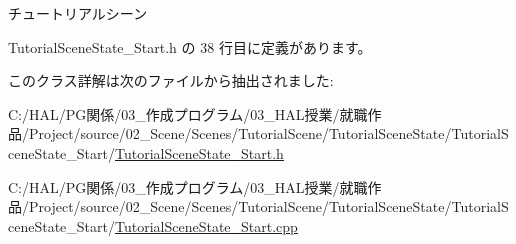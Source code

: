 チュートリアルシーン 



 Tutorial\+Scene\+State\+\_\+\+Start.\+h の 38 行目に定義があります。



このクラス詳解は次のファイルから抽出されました\+:\begin{DoxyCompactItemize}
\item 
C\+:/\+H\+A\+L/\+P\+G関係/03\+\_\+作成プログラム/03\+\_\+\+H\+A\+L授業/就職作品/\+Project/source/02\+\_\+\+Scene/\+Scenes/\+Tutorial\+Scene/\+Tutorial\+Scene\+State/\+Tutorial\+Scene\+State\+\_\+\+Start/\mbox{\hyperlink{_tutorial_scene_state___start_8h}{Tutorial\+Scene\+State\+\_\+\+Start.\+h}}\item 
C\+:/\+H\+A\+L/\+P\+G関係/03\+\_\+作成プログラム/03\+\_\+\+H\+A\+L授業/就職作品/\+Project/source/02\+\_\+\+Scene/\+Scenes/\+Tutorial\+Scene/\+Tutorial\+Scene\+State/\+Tutorial\+Scene\+State\+\_\+\+Start/\mbox{\hyperlink{_tutorial_scene_state___start_8cpp}{Tutorial\+Scene\+State\+\_\+\+Start.\+cpp}}\end{DoxyCompactItemize}
